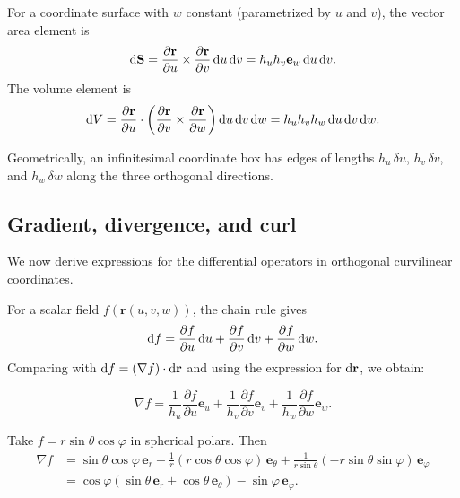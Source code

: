 \documentclass[a4paper]{article}
\begin{document}
\begin{prop}
  For a coordinate surface with $w$ constant (parametrized by $u$ and $v$), the vector area element is
  \[
    \mathrm{d} \mathbf{S} = \frac{\partial \mathbf{r}}{\partial u}\times \frac{\partial \mathbf{r}}{\partial v}\,\mathrm{d} u\,\mathrm{d} v = h_uh_v \mathbf{e}_w \,\mathrm{d} u\,\mathrm{d} v.
  \]
  The volume element is
  \[
    \mathrm{d} V = \frac{\partial \mathbf{r}}{\partial u}\cdot \left(\frac{\partial \mathbf{r}}{\partial v}\times \frac{\partial \mathbf{r}}{\partial w}\right)\mathrm{d} u\,\mathrm{d} v\,\mathrm{d} w = h_uh_vh_w \,\mathrm{d} u\,\mathrm{d} v\,\mathrm{d} w.
  \]
\end{prop}

\begin{rmk}
  Geometrically, an infinitesimal coordinate box has edges of lengths $h_u\,\delta u$, $h_v\,\delta v$, and $h_w\,\delta w$ along the three orthogonal directions.
\end{rmk}

\subsection{Gradient, divergence, and curl}
We now derive expressions for the differential operators in orthogonal curvilinear coordinates.

For a scalar field $f(\mathbf{r}(u, v, w))$, the chain rule gives
\[
  \mathrm{d} f = \frac{\partial f}{\partial u}\,\mathrm{d} u + \frac{\partial f}{\partial v}\,\mathrm{d} v + \frac{\partial f}{\partial w}\,\mathrm{d} w.
\]
Comparing with $\mathrm{d} f = (\nabla f)\cdot \mathrm{d} \mathbf{r}$ and using the expression for $\mathrm{d}\mathbf{r}$, we obtain:

\begin{prop}
  \[
    \nabla f = \frac{1}{h_u} \frac{\partial f}{\partial u} \mathbf{e}_u + \frac{1}{h_v} \frac{\partial f}{\partial v}\mathbf{e}_v + \frac{1}{h_w} \frac{\partial f}{\partial w}\mathbf{e}_w.
  \]
\end{prop}
\begin{eg}
  Take $f = r\sin \theta\cos \varphi$ in spherical polars. Then
  \begin{align*}
    \nabla f &= \sin \theta\cos \varphi\,\mathbf{e}_r + \frac{1}{r}(r\cos \theta\cos \varphi)\,\mathbf{e}_\theta + \frac{1}{r\sin \theta}(-r\sin \theta\sin \varphi)\,\mathbf{e}_\varphi\\
    &= \cos\varphi(\sin \theta \,\mathbf{e}_r + \cos \theta \,\mathbf{e}_\theta) - \sin \varphi \,\mathbf{e}_\varphi.
  \end{align*}
\end{eg}
\end{document}
